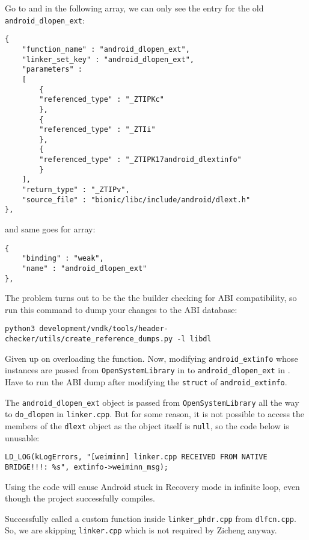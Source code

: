 Go to  and in the following  array, we can only see the entry for the old \texttt{android\_dlopen\_ext}:
\begin{lstlisting}
{
    "function_name" : "android_dlopen_ext",
    "linker_set_key" : "android_dlopen_ext",
    "parameters" :
    [
        {
        "referenced_type" : "_ZTIPKc"
        },
        {
        "referenced_type" : "_ZTIi"
        },
        {
        "referenced_type" : "_ZTIPK17android_dlextinfo"
        }
    ],
    "return_type" : "_ZTIPv",
    "source_file" : "bionic/libc/include/android/dlext.h"
},
\end{lstlisting}
and same goes for  array:
\begin{lstlisting}
{
    "binding" : "weak",
    "name" : "android_dlopen_ext"
},
\end{lstlisting}
The problem turns out to be the the builder checking for ABI compatibility, so run this command to dump your changes to the ABI database:
\begin{lstlisting}
python3 development/vndk/tools/header-checker/utils/create_reference_dumps.py -l libdl
\end{lstlisting}

Given up on overloading the function. Now, modifying \texttt{android\_extinfo} whose instances are passed from \texttt{OpenSystemLibrary} in  to \texttt{android\_dlopen\_ext} in . Have to run the ABI dump after modifying the \texttt{struct} of \texttt{android\_extinfo}.

The \texttt{android\_dlopen\_ext} object is passed from \texttt{OpenSystemLibrary} all the way to  \texttt{do\_dlopen} in \texttt{linker.cpp}. But for some reason, it is not possible to access the members of the \texttt{dlext} object as the object itself is \texttt{null}, so the code below is unusable:
\begin{lstlisting}
LD_LOG(kLogErrors, "[weiminn] linker.cpp RECEIVED FROM NATIVE BRIDGE!!!: %s", extinfo->weiminn_msg);
\end{lstlisting}
Using the code will cause Android stuck in Recovery mode in infinite loop, even though the project successfully compiles. 

Successfully called a custom function inside \texttt{linker\_phdr.cpp} from \texttt{dlfcn.cpp}. So, we are skipping \texttt{linker.cpp} which is not required by Zicheng anyway.

